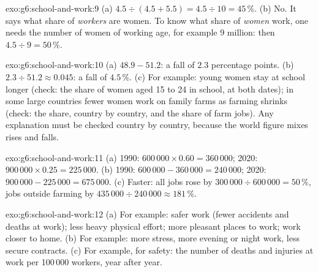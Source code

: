 \begin{solution}{exo:g6:school-and-work:9}
(a) $4.5 \div (4.5 + 5.5) = 4.5 \div 10 = 45\,\%$. (b) No. It says what share of
\emph{workers} are women. To know what share of \emph{women} work, one needs the
number of women of working age, for example 9 million: then $4.5 \div 9 = 50\,\%$.
\end{solution}

\begin{solution}{exo:g6:school-and-work:10}
(a) $48.9 - 51.2$: a fall of $2.3$ percentage points. (b) $2.3 \div 51.2 \approx
0.045$: a fall of $4.5\,\%$. (c) For example: young women stay at school longer
(check: the share of women aged 15 to 24 in school, at both dates); in some large
countries fewer women work on family farms as farming shrinks (check: the share,
country by country, and the share of farm jobs). Any explanation must be checked
country by country, because the world figure mixes rises and falls.
\end{solution}

\begin{solution}{exo:g6:school-and-work:11}
(a) 1990: $600\,000 \times 0.60 = 360\,000$; 2020: $900\,000 \times 0.25 =
225\,000$. (b) 1990: $600\,000 - 360\,000 = 240\,000$; 2020: $900\,000 - 225\,000 =
675\,000$. (c) Faster: all jobs rose by $300\,000 \div 600\,000 = 50\,\%$, jobs
outside farming by $435\,000 \div 240\,000 \approx 181\,\%$.
\end{solution}

\begin{solution}{exo:g6:school-and-work:12}
(a) For example: safer work (fewer accidents and deaths at work); less heavy
physical effort; more pleasant places to work; work closer to home. (b) For
example: more stress, more evening or night work, less secure contracts.
(c) For example, for safety: the number of deaths and injuries at work per
100\,000 workers, year after year.
\end{solution}


